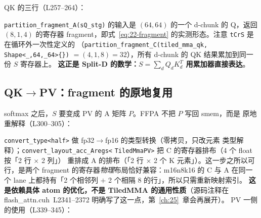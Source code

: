 QK 的三行（L257--264）：



\begin{sloppypar}
\texttt{partition\_\allowbreak{}fragment\_\allowbreak{}A\allowbreak{}(sQ\_\allowbreak{}stg)} 的输入是 $(64,64)$ 的一个
d-chunk 的 Q，返回 $(8,1,4)$ 的寄存器 fragment，即式~\eqref{eq:22-fragment}
的实测形态。注意 \texttt{tCrS} 是在循环外一次性定义的
（\texttt{partition\_\allowbreak{}fragment\_\allowbreak{}C\allowbreak{}(tiled\_\allowbreak{}mma\_\allowbreak{}qk,\allowbreak{}}\allowbreak
\texttt{Shape\allowbreak{}<\_\allowbreak{},\allowbreak{}64,\allowbreak{}\_\allowbreak{}64>\{\})}
$=(4,1,8)=32$），所有 d-chunk 的 QK 结果累加到同一份 $S$ 寄存器上。
\textbf{这正是 Split-D 的数学：$S=\sum_{d} Q_d K_d^T$ 用累加器直接表达}。
\end{sloppypar}

\subsection{QK$\to$PV：fragment 的原地复用}

softmax 之后，$S$ 要变成 PV 的 A 矩阵 $P$。FFPA 不把 $P$ 写回 smem，而是
原地重解释（L300--305）：



\begin{sloppypar}
\texttt{convert\_\allowbreak{}type\allowbreak{}<half>} 做 fp32$\to$fp16 的类型转换（零拷贝，只改元素
类型解释）；\texttt{convert\_\allowbreak{}layout\_\allowbreak{}acc\_\allowbreak{}Aregs\allowbreak{}<}\allowbreak
\texttt{TiledMmaPV>} 把 C 的寄存器排布（4 个 float 按「2 行 $\times$ 2 列」）
重排成 A 的排布（「2 行 $\times$ 2 个 K 元素」）。这一步之所以可行，是两个
fragment 的寄存器\emph{物理}布局恰好兼容：m16n8k16 的 C 与 A 在同一个 lane
上都持有「2 个相邻列 $+$ 2 个相隔 8 的行」，所以只需重新映射索引。
\textbf{这是依赖具体 atom 的优化，不是 TiledMMA 的通用性质}（源码注释在
flash\_attn.cuh~L2341--2372 明确写了这一点，第~\ref{ch:25}~章会再展开）。
PV 一侧的使用（L339--345）：
\end{sloppypar}



